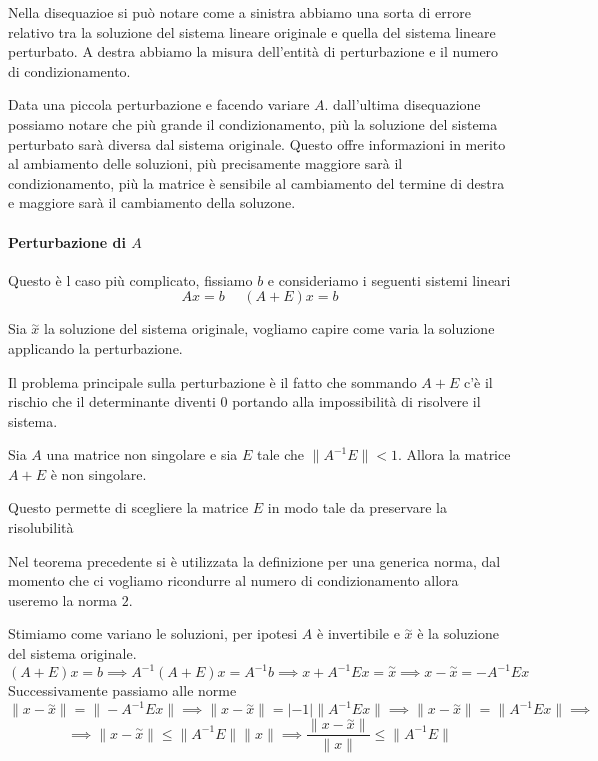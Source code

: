 Nella disequazioe si può notare come a sinistra abbiamo una sorta di errore relativo 
tra la soluzione del sistema lineare originale e quella del sistema lineare perturbato.
A destra abbiamo la misura dell'entità di perturbazione e il numero di condizionamento.

Data una piccola perturbazione e facendo variare $A$. dall'ultima disequazione 
possiamo notare che più grande il condizionamento, più la soluzione del sistema 
perturbato sarà diversa dal sistema originale. Questo offre informazioni in merito 
al ambiamento delle soluzioni, più precisamente maggiore sarà il condizionamento,
più la matrice è sensibile al cambiamento del termine di destra e maggiore 
sarà il cambiamento della soluzone.

\paragraph{Perturbazione di $A$}
Questo è l caso più complicato, fissiamo $b$ e consideriamo i seguenti sistemi lineari
\begin{equation*}
    Ax=b \ \ \ \ \ \ (A+E)x = b
\end{equation*}

Sia $\stackrel{\sim}{x}$ la soluzione del sistema originale, vogliamo capire come 
varia la soluzione applicando la perturbazione. 

Il problema principale sulla perturbazione è il fatto che sommando $A+E$ c'è il 
rischio che il determinante diventi $0$ portando alla impossibilità di risolvere
il sistema.

\begin{teorema}
    Sia $A$ una matrice non singolare e sia $E$ tale che $\|A^{-1}E\|<1$. Allora 
    la matrice $A+E$ è non singolare.
\end{teorema}

Questo permette di scegliere la matrice $E$ in modo tale da preservare la risolubilità

\begin{nota}
    Nel teorema precedente si è utilizzata la definizione per una generica norma, 
    dal momento che ci vogliamo ricondurre al numero di condizionamento allora 
    useremo la norma $2$.
\end{nota}

Stimiamo come variano le soluzioni, per ipotesi $A$ è invertibile e $\stackrel{\sim}{x}$
è la soluzione del sistema originale.
$$(A+E)x= b \implies A^{-1}(A+E)x= A^{-1}b \implies x+A^{-1}Ex=\stackrel{\sim}{x}\implies
x-\stackrel{\sim}{x}=-A^{-1}Ex$$
Successivamente passiamo alle norme
$$\|x-\stackrel{\sim}{x}\|=\|-A^{-1}Ex\|\implies \|x-\stackrel{\sim}{x}\|=|-1|\|A^{-1}Ex\|
\implies \|x-\stackrel{\sim}{x}\|=\|A^{-1}Ex\|\implies  
$$$$\implies\|x-\stackrel{\sim}{x}\|\le\|A^{-1}E\|\|x\|\implies \frac{\|x-\stackrel{\sim}{x}\|}{\|x\|}\le\|A^{-1}E\|$$

